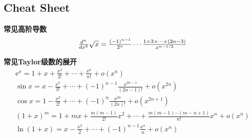 \subsection{Cheat Sheet}

\textbf{常见高阶导数}
\[
\begin{array}{l}
    {d^n \over dx^2}\sqrt x = {(-1)^{n-1}\over 2^n} \cdots {1\times 3\times\cdots\times (2n-3)\over x^{n-1/2}}
\end{array}    
\]


\textbf{常见Taylor级数的展开}
\[
\begin{array}{l}
    \mathrm{e}^{x}=1+x+\frac{x^{2}}{2 !}+\cdots+\frac{x^{n}}{n !}+o\left(x^{n}\right) \\
    \sin x=x-\frac{x^{3}}{3 !}+\cdots+(-1)^{n-1} \frac{x^{2 n-1}}{(2 n-1) !}+o\left(x^{2 n}\right) \\
    \cos x=1-\frac{x^{2}}{2 !}+\cdots+(-1)^{n} \frac{x^{2 n}}{(2 n) !}+o\left(x^{2 n+1}\right) \\
    (1+x)^{m}=1+m x+\frac{m(m-1)}{2 !} x^{2}+\cdots+\frac{m(m-1) \cdots(m-n+1)}{n !} x^{n}+o\left(x^{n}\right) \\
    \ln (1+x)=x-\frac{x^{2}}{2}+\cdots+(-1)^{n-1} \frac{x^{n}}{n}+o\left(x^{n}\right)
\end{array}
\]
